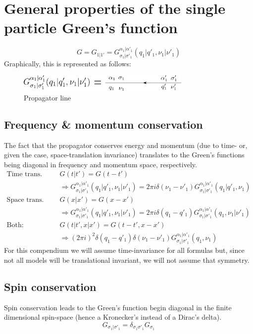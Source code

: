 \documentclass[12pt,a4paper,roman]{article}
\begin{document}
\section*{General properties of the single particle Green's function}
\begin{equation}
G = G_{1|1'} = G^{\alpha_1|\alpha'_1}_{\sigma_1|\sigma'_1}(q_1|q'_1, \nu_1| \nu'_1)
\end{equation}
Graphically, this is represented as follows:
\begin{figure}[h]
	\centering
	\includegraphics[width=0.75\textwidth]{propagator}
	\caption{Propagator line}
	\label{fig:prop}
\end{figure}



\subsection*{Frequency \& momentum conservation}
The fact that the propagator conserves energy and momentum (due to time- or, given the case, space-translation invariance) translates to the Green's functions being diagonal in frequency and momentum space, respectively.
\begin{align}
\text{Time trans. inv: } &G(t|t') = G(t-t')\\ &\Rightarrow G^{\alpha_1|\alpha'_1}_{\sigma_1|\sigma'_1}(q_1|q'_1, \nu_1| \nu'_1) = 2\pi i \delta(\nu_1-\nu'_1)G^{\alpha_1|\alpha'_1}_{\sigma_1|\sigma'_1}(q_1|q'_1, \nu_1)\\
\text{Space trans. inv: } &G(x|x') = G(x-x')\\ &\Rightarrow G^{\alpha_1|\alpha'_1}_{\sigma_1|\sigma'_1}(q_1|q'_1, \nu_1| \nu'_1) = 2\pi i \delta(q_1-q'_1)G^{\alpha_1|\alpha'_1}_{\sigma_1|\sigma'_1}(q_1, \nu_1| \nu'_1)\\
\text{Both: } &G(t|t', x|x') = G(t-t',x-x')\\ &\Rightarrow
(2\pi i)^2 \delta(q_1-q'_1)\delta(\nu_1-\nu'_1)G^{\alpha_1|\alpha'_1}_{\sigma_1|\sigma'_1}(q_1, \nu_1)
\end{align}
For this compendium we will assume time-invariance for all formulas but, since not all models will be translational invariant, we will not assume that symmetry.

\subsection*{Spin conservation}
Spin conservation leads to the Green's function begin diagonal in the finite dimensional spin-space (hence a Kronecker's instead of a Dirac's delta).
\begin{equation}
G_{\sigma_1|\sigma'_1} = \delta_{\sigma_1 \sigma'_1}G_{\sigma_1}
\end{equation}
\end{document}
